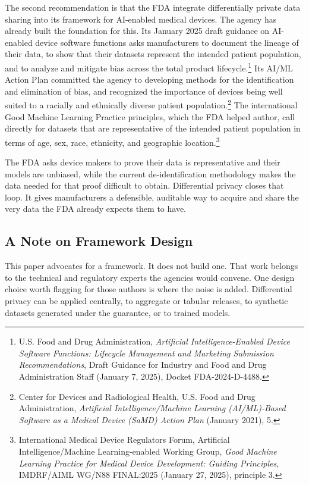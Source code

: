 \documentclass[11pt]{article}
\begin{document}
The second recommendation is that the FDA integrate differentially private data sharing into its framework for AI-enabled medical devices. The agency has already built the foundation for this. Its January 2025 draft guidance on AI-enabled device software functions asks manufacturers to document the lineage of their data, to show that their datasets represent the intended patient population, and to analyze and mitigate bias across the total product lifecycle.\footnote{U.S. Food and Drug Administration, \textit{Artificial Intelligence-Enabled Device Software Functions: Lifecycle Management and Marketing Submission Recommendations}, Draft Guidance for Industry and Food and Drug Administration Staff (January 7, 2025), Docket FDA-2024-D-4488.} Its AI/ML Action Plan committed the agency to developing methods for the identification and elimination of bias, and recognized the importance of devices being well suited to a racially and ethnically diverse patient population.\footnote{Center for Devices and Radiological Health, U.S. Food and Drug Administration, \textit{Artificial Intelligence/Machine Learning (AI/ML)-Based Software as a Medical Device (SaMD) Action Plan} (January 2021), 5.} The international Good Machine Learning Practice principles, which the FDA helped author, call directly for datasets that are representative of the intended patient population in terms of age, sex, race, ethnicity, and geographic location.\footnote{International Medical Device Regulators Forum, Artificial Intelligence/Machine Learning-enabled Working Group, \textit{Good Machine Learning Practice for Medical Device Development: Guiding Principles}, IMDRF/AIML WG/N88 FINAL:2025 (January 27, 2025), principle 3.}

The FDA asks device makers to prove their data is representative and their models are unbiased, while the current de-identification methodology makes the data needed for that proof difficult to obtain. Differential privacy closes that loop. It gives manufacturers a defensible, auditable way to acquire and share the very data the FDA already expects them to have.

\subsection{A Note on Framework Design}

This paper advocates for a framework. It does not build one. That work belongs to the technical and regulatory experts the agencies would convene. One design choice worth flagging for those authors is where the noise is added. Differential privacy can be applied centrally, to aggregate or tabular releases, to synthetic datasets generated under the guarantee, or to trained models.
\end{document}
